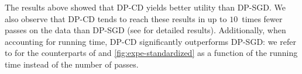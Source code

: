 The results above showed that DP-CD yields better
utility than DP-SGD. We also observe that DP-CD tends to reach
these
results in up to $10$~times fewer passes on the data than DP-SGD (see
 for detailed results). Additionally, when accounting
for running time, DP-CD
significantly outperforms DP-SGD: we refer to  for
the counterparts of  and \ref{fig:expe-standardized} as a
function of the running time instead of the number of passes.



























